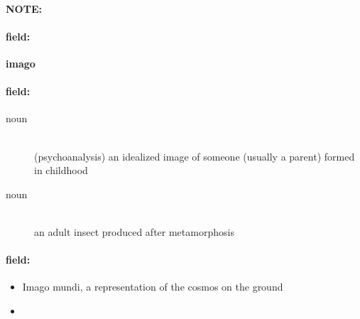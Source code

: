 \documentclass[12pt]{article}
\newenvironment{note}{\paragraph{NOTE:}}{}
\newenvironment{field}{\paragraph{field:}}{}
\begin{document}
\begin{note}
\begin{field}
\textbf{\large imago}
\end{field}


\begin{field}
\begin{description}
\item[noun] \hfill \\ 
(psychoanalysis) an idealized image of someone (usually a parent) formed in childhood

\item[noun] \hfill \\ 
an adult insect produced after metamorphosis

\end{description}
\end{field}

\begin{field}
\begin{itemize}
\item Imago mundi, a representation of the cosmos on the ground
\item 
\end{itemize}
\end{field}
\end{note}
\end{document}
